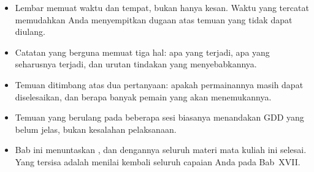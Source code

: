 \begin{rangkumanbox}
\begin{itemize}
        tidak memeriksa bunyi maupun animasi, dan hanya memeriksa level yang
        tertulis pada berkasnya.
  \item Lembar  memuat waktu dan tempat, bukan hanya kesan.
        Waktu yang tercatat memudahkan Anda menyempitkan dugaan atas temuan
        yang tidak dapat diulang.
  \item Catatan  yang berguna memuat tiga hal: apa yang terjadi,
        apa yang seharusnya terjadi, dan urutan tindakan yang menyebabkannya.
  \item Temuan ditimbang atas dua pertanyaan: apakah permainannya masih dapat
        diselesaikan, dan berapa banyak pemain yang akan menemukannya.
  \item Temuan yang berulang pada beberapa sesi biasanya menandakan GDD yang
        belum jelas, bukan kesalahan pelaksanaan.
  \item Bab ini menuntaskan , dan dengannya seluruh materi
        mata kuliah ini selesai. Yang tersisa adalah menilai kembali seluruh
        capaian Anda pada Bab~XVII.
\end{itemize}
\end{rangkumanbox}

